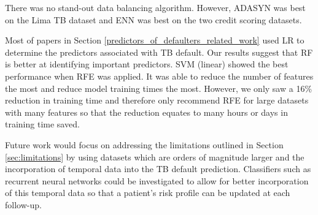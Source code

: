 \documentclass{sig-alternate-05-2015}
\begin{document}
	There was no stand-out data balancing algorithm. However, ADASYN was best on the Lima TB dataset and ENN was best on the two credit scoring datasets.
		
	Most of papers in Section \ref{predictors_of_defaulters_related_work} used LR to determine the predictors associated with TB default. Our results suggest that RF is better at identifying important predictors. SVM (linear) showed the best performance when RFE was applied. It was able to reduce the number of features the most and reduce model training times the most. However, we only saw a 16\% reduction in training time and therefore only recommend RFE for large datasets with many features so that the reduction equates to many hours or days in training time saved.
	
	Future work would focus on addressing the limitations outlined in Section \ref{sec:limitations} by using datasets which are orders of magnitude larger and the incorporation of temporal data into the TB default prediction. Classifiers such as recurrent neural networks could be investigated to allow for better incorporation of this temporal data so that a patient's risk profile can be updated at each follow-up.
	
	
	
	
\end{document}
